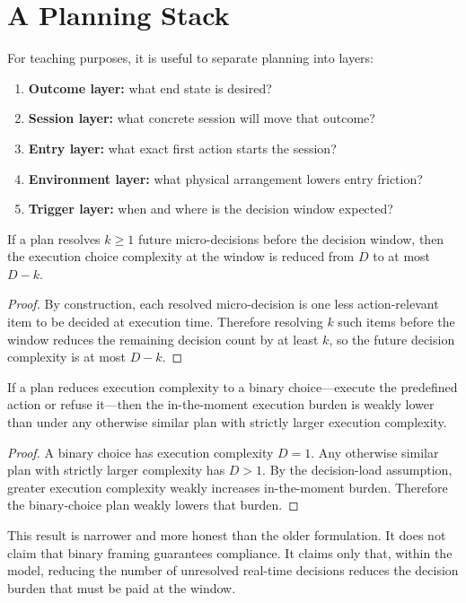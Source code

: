 \section{A Planning Stack}

For teaching purposes, it is useful to separate planning into layers:
\begin{enumerate}[nosep]
  \item \textbf{Outcome layer:} what end state is desired?
  \item \textbf{Session layer:} what concrete session will move that outcome?
  \item \textbf{Entry layer:} what exact first action starts the session?
  \item \textbf{Environment layer:} what physical arrangement lowers entry
        friction?
  \item \textbf{Trigger layer:} when and where is the decision window expected?
\end{enumerate}

\begin{proposition}
If a plan resolves $k \geq 1$ future micro-decisions before the decision
window, then the execution choice complexity at the window is reduced from $D$
to at most $D-k$.
\end{proposition}

\begin{proof}
By construction, each resolved micro-decision is one less action-relevant item
to be decided at execution time. Therefore resolving $k$ such items before the
window reduces the remaining decision count by at least $k$, so the future
decision complexity is at most $D-k$.
\end{proof}

\begin{corollary}
If a plan reduces execution complexity to a binary choice---execute the
predefined action or refuse it---then the in-the-moment execution burden is
weakly lower than under any otherwise similar plan with strictly larger
execution complexity.
\end{corollary}

\begin{proof}
A binary choice has execution complexity $D=1$. Any otherwise similar plan with
strictly larger complexity has $D>1$. By the decision-load assumption, greater
execution complexity weakly increases in-the-moment burden. Therefore the
binary-choice plan weakly lowers that burden.
\end{proof}

\begin{discussion}
This result is narrower and more honest than the older formulation. It does not
claim that binary framing guarantees compliance. It claims only that, within
the model, reducing the number of unresolved real-time decisions reduces the
decision burden that must be paid at the window.
\end{discussion}
